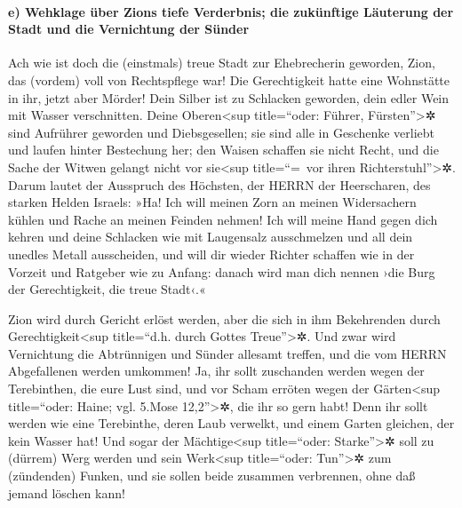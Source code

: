 \hypertarget{e-wehklage-uxfcber-zions-tiefe-verderbnis-die-zukuxfcnftige-luxe4uterung-der-stadt-und-die-vernichtung-der-suxfcnder}{%
\paragraph{e) Wehklage über Zions tiefe Verderbnis; die zukünftige
Läuterung der Stadt und die Vernichtung der
Sünder}\label{e-wehklage-uxfcber-zions-tiefe-verderbnis-die-zukuxfcnftige-luxe4uterung-der-stadt-und-die-vernichtung-der-suxfcnder}}

Ach wie ist doch die (einstmals) treue Stadt zur
Ehebrecherin geworden, Zion, das (vordem) voll von Rechtspflege war! Die
Gerechtigkeit hatte eine Wohnstätte in ihr, jetzt aber Mörder!
Dein Silber ist zu Schlacken geworden, dein edler Wein
mit Wasser verschnitten. Deine Oberen\textless sup
title=``oder: Führer, Fürsten''\textgreater✲ sind Aufrührer geworden und
Diebsgesellen; sie sind alle in Geschenke verliebt und laufen hinter
Bestechung her; den Waisen schaffen sie nicht Recht, und die Sache der
Witwen gelangt nicht vor sie\textless sup title=``=~vor ihren
Richterstuhl''\textgreater✲. Darum lautet der Ausspruch
des Höchsten, der HERRN der Heerscharen, des starken Helden Israels:
»Ha! Ich will meinen Zorn an meinen Widersachern kühlen und Rache an
meinen Feinden nehmen! Ich will meine Hand gegen dich
kehren und deine Schlacken wie mit Laugensalz ausschmelzen und all dein
unedles Metall ausscheiden, und will dir wieder Richter
schaffen wie in der Vorzeit und Ratgeber wie zu Anfang: danach wird man
dich nennen ›die Burg der Gerechtigkeit, die treue Stadt‹.«

Zion wird durch Gericht erlöst werden, aber die sich in
ihm Bekehrenden durch Gerechtigkeit\textless sup title=``d.h. durch
Gottes Treue''\textgreater✲. Und zwar wird Vernichtung
die Abtrünnigen und Sünder allesamt treffen, und die vom HERRN
Abgefallenen werden umkommen! Ja, ihr sollt zuschanden
werden wegen der Terebinthen, die eure Lust sind, und vor Scham erröten
wegen der Gärten\textless sup title=``oder: Haine; vgl. 5.Mose
12,2''\textgreater✲, die ihr so gern habt! Denn ihr sollt
werden wie eine Terebinthe, deren Laub verwelkt, und einem Garten
gleichen, der kein Wasser hat! Und sogar der
Mächtige\textless sup title=``oder: Starke''\textgreater✲ soll zu
(dürrem) Werg werden und sein Werk\textless sup title=``oder:
Tun''\textgreater✲ zum (zündenden) Funken, und sie sollen beide zusammen
verbrennen, ohne daß jemand löschen kann!

